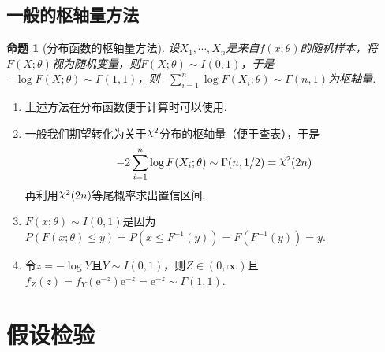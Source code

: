 \documentclass[12pt, a4paper, oneside]{ctexart}
\newtheorem{proposition}[theorem]{命题}
\numberwithin{equation}{section}  %
\newenvironment{remark}{\begin{enumerate}[label=\textbf{注\arabic*.}]}{\end{enumerate}}
\let\leq=\leqslant %
\DeclareRobustCommand{\rchi}{{\mathpalette\irchi\relax}}
\newcommand{\irchi}[2]{\raisebox{\depth}{$#1\chi$}} %
\def\e{\mathrm{e}}          %
\begin{document}
\subsection{一般的枢轴量方法}
\begin{proposition}[分布函数的枢轴量方法]
    设$X_1,\cdots,X_n$是来自$f(x;\theta)$的随机样本，将$F(X;\theta)$视为随机变量，则$F(X;\theta)\sim I(0,1)$，于是$-\log F(X;\theta)\sim\Gamma(1,1)$，则$-\sum_{i=1}^n\log F(X_i;\theta)\sim \Gamma(n,1)$为枢轴量.
\end{proposition}
\begin{remark}
    \item 上述方法在分布函数便于计算时可以使用.
    \item 一般我们期望转化为关于$\rchi^2$分布的枢轴量（便于查表），于是
    \begin{equation*}
        -2\sum_{i=1}^n\log F(X_i;\theta)\sim\Gamma(n,1/2) = \rchi^2(2n)   
    \end{equation*}
    再利用$\rchi^2(2n)$等尾概率求出置信区间.
    \item $F(x;\theta)\sim I(0,1)$是因为$P(F(x;\theta)\leq y) = P(x\leq F^{-1}(y))=F(F^{-1}(y))=y$.
    \item 令$z=-\log Y$且$Y\sim I(0,1)$，则$Z\in(0,\infty)$且$f_Z(z)=f_Y(\e^{-z})\e^{-z}=\e^{-z}\sim\Gamma(1,1)$.
\end{remark}
\section{假设检验}
\end{document}
